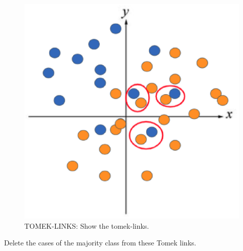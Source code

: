 \begin{center}
    \begin{figure}[ht]
        \caption{TOMEK-LINKS: Show the tomek-links.}
        \label{tab:team-rating-features}
        \begin{center}
            \includegraphics[scale=0.6]{image/tomek2.eps}
        \end{center}
    \end{figure}
\end{center}

\clearpage

Delete the cases of the majority class from these Tomek links.

